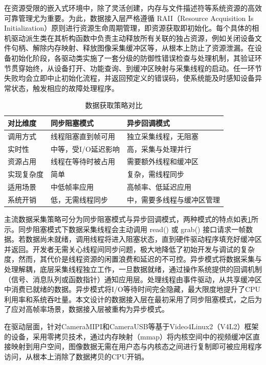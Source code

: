 在资源受限的嵌入式环境中，除了灵活创建，内存与文件描述符等系统资源的高效可靠管理尤为重要。为此，数据接入层严格遵循 RAII（Resource Acquisition Is Initialization）原则进行资源生命周期管理，即资源获取即初始化。每个具体的相机驱动派生类在其析构函数中负责主动释放所有关联的独占资源，例如关闭设备文件句柄、解除内存映射、释放图像采集缓冲区等，从根本上防止了资源泄漏。在设备初始化阶段，各驱动类实施了一套分级的防御性错误检查与处理机制，其验证环节贯穿始终，从设备打开、功能查询、到缓冲区映射与采集线程的启动。任一环节失败均会立即中止初始化流程，并返回预定义的错误码，使系统能及时感知设备异常状态，触发相应的故障处理程序。

\begin{table}[htbp]
\centering
\caption{数据获取策略对比}
\label{tab:data_acquisition_strategies}
{
    \linespread{1.5}\selectfont
    \renewcommand{\arraystretch}{1.2}
\begin{tabular}{p{4cm}p{6cm}p{4cm}}
\toprule
\textbf{对比维度} & \textbf{同步阻塞模式} & \textbf{异步回调模式} \\
\midrule
调用方式 & 线程阻塞直到帧可用 & 独立采集线程，无阻塞 \\
实时性 & 中等，受I/O延迟影响 & 高，采集与处理并行 \\
资源占用 & 线程在等待时被占用 & 需要额外线程和缓冲区 \\
实现复杂度 & 简单 & 复杂，需线程同步 \\
适用场景 & 中低帧率应用 & 高帧率、低延迟应用 \\
系统开销 & 低，无需线程同步 & 中，需要多线程与缓冲区管理 \\
\bottomrule
\end{tabular}
}
\end{table}

主流数据采集策略可分为同步阻塞模式与异步回调模式，两种模式的特点如表\ref{tab:data_acquisition_strategies}所示。同步阻塞模式下数据采集线程会主动调用 read() 或 grab() 接口请求一帧数据。若数据尚未就绪，调用线程将进入阻塞状态，直到硬件驱动程序填充好缓冲区并返回。开发者无需关心线程间同步问题，极大地降低了初始开发与调试的复杂度，然而，其代价是线程资源的闲置浪费和延迟的不可控。异步模式将数据采集与处理解耦，底层采集线程独立工作，一旦数据就绪，通过操作系统提供的回调机制（信号、消息队列或函数指针）通知应用层。处理线程由事件驱动，从共享缓冲区中消费已就绪的数据。异步模式将I/O等待时间完全隐藏，最大限度地提升了CPU利用率和系统吞吐量。本文设计的数据接入层在最初采用了同步阻塞模式，之后为了应对高帧率场景，数据接入层被重构为异步模式。

在驱动层面，针对CameraMIPI和CameraUSB等基于Video4Linux2（V4L2）框架的设备，采用零拷贝技术，通过内存映射（mmap）将内核空间中的视频缓冲区直接映射到用户空间，图像数据无需在用户态与内核态之间进行复制即可被应用程序访问，从根本上消除了数据拷贝的CPU开销。

